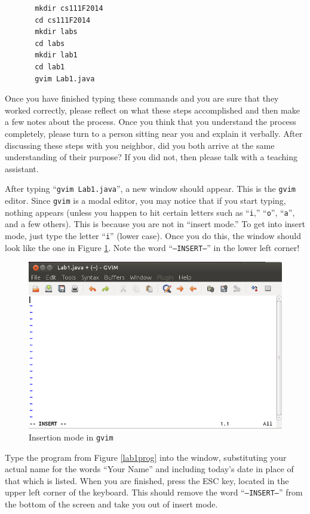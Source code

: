 \begin{verbatim}
       mkdir cs111F2014
       cd cs111F2014
       mkdir labs
       cd labs
       mkdir lab1
       cd lab1
       gvim Lab1.java
\end{verbatim}

Once you have finished typing these commands and you are sure that they worked correctly, please reflect on what these
steps accomplished and then make a few notes about the process.  Once you think that you understand the process
completely, please turn to a person sitting near you and explain it verbally.  After discussing these steps with you
neighbor, did you both arrive at the same understanding of their purpose? If you did not, then please talk with a teaching
assistant. 

After typing ``{\tt gvim Lab1.java}'', a new window should appear. This is the {\tt gvim} editor.  Since {\tt gvim} is a
modal editor, you may notice that if you start typing, nothing appears (unless you happen to hit certain letters such as
  ``{\tt i},'' ``{\tt o}'', ``{\tt a}'', and a few others). This is because you are not in ``insert mode.'' To get into
insert mode, just type the letter ``{\tt i}'' (lower case). Once you do this, the window should look like the one in
Figure \ref{gvim-insert}. Note the word ``{\tt --INSERT--}'' in the lower left corner!

\begin{figure}[htbp]
  \centering
  \includegraphics[width=4.5in]{images/gvim-insert}
  \caption{Insertion mode in {\tt gvim}}
  \label{gvim-insert}
\end{figure}

Type the program from Figure \ref{lab1prog} into the window, substituting your actual name for the words ``Your Name''
and including today's date in place of that which is listed. When you are finished, press the ESC key, located in the upper
left corner of the keyboard.  This should remove the word ``{\tt --INSERT--}'' from the bottom of the screen and take
you out of insert mode.

